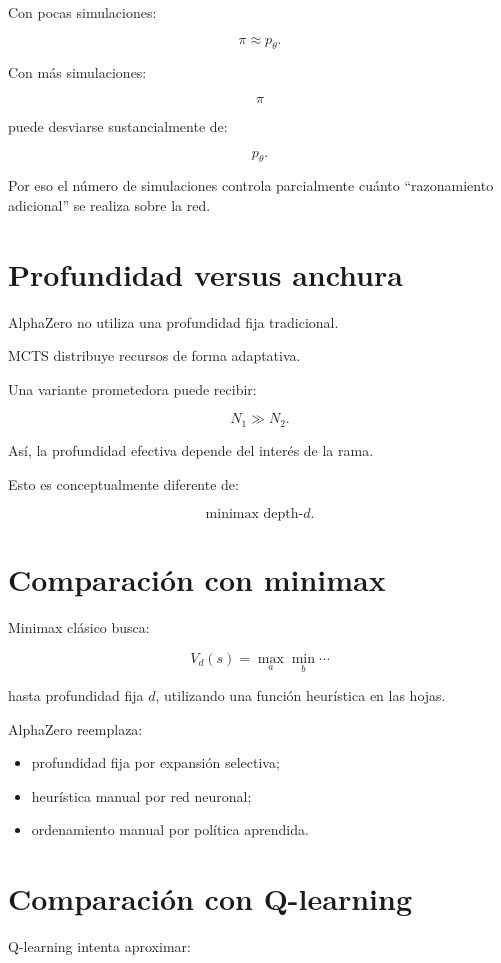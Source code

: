 \documentclass[11pt,a4paper]{article}
\begin{document}
Con pocas simulaciones:

\[
\pi
\approx
p_\theta.
\]

Con más simulaciones:

\[
\pi
\]

puede desviarse sustancialmente de:

\[
p_\theta.
\]

Por eso el número de simulaciones controla parcialmente cuánto ``razonamiento adicional'' se realiza sobre la red.

\section{Profundidad versus anchura}

AlphaZero no utiliza una profundidad fija tradicional.

MCTS distribuye recursos de forma adaptativa.

Una variante prometedora puede recibir:

\[
N_1\gg N_2.
\]

Así, la profundidad efectiva depende del interés de la rama.

Esto es conceptualmente diferente de:

\[
\text{minimax depth-}d.
\]

\section{Comparación con minimax}

Minimax clásico busca:

\[
V_d(s)
=
\max_a
\min_b
\cdots
\]

hasta profundidad fija \(d\), utilizando una función heurística en las hojas.

AlphaZero reemplaza:

\begin{itemize}
    \item profundidad fija por expansión selectiva;
    \item heurística manual por red neuronal;
    \item ordenamiento manual por política aprendida.
\end{itemize}

\section{Comparación con Q-learning}

Q-learning intenta aproximar:
\end{document}

